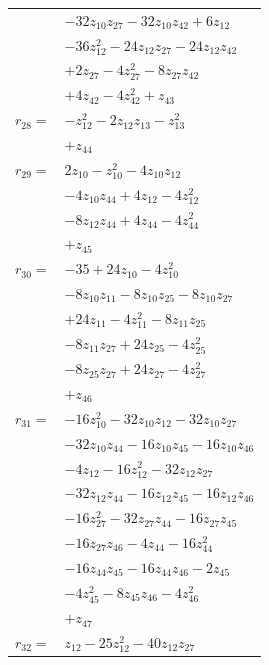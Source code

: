 \begin{longtable}{@{}r@{\;}l@{}}
 & \(\displaystyle -32z_{10}z_{27} -32z_{10}z_{42} +6z_{12}\) \\
 & \(\displaystyle -36z_{12}^{2} -24z_{12}z_{27} -24z_{12}z_{42}\) \\
 & \(\displaystyle +2z_{27} -4z_{27}^{2} -8z_{27}z_{42}\) \\
 & \(\displaystyle +4z_{42} -4z_{42}^{2} +z_{43}\) \\[3pt]
\(r_{28}=\) & \(\displaystyle -z_{12}^{2} -2z_{12}z_{13} -z_{13}^{2}\) \\
 & \(\displaystyle +z_{44}\) \\[3pt]
\(r_{29}=\) & \(\displaystyle 2z_{10} -z_{10}^{2} -4z_{10}z_{12}\) \\
 & \(\displaystyle -4z_{10}z_{44} +4z_{12} -4z_{12}^{2}\) \\
 & \(\displaystyle -8z_{12}z_{44} +4z_{44} -4z_{44}^{2}\) \\
 & \(\displaystyle +z_{45}\) \\[3pt]
\(r_{30}=\) & \(\displaystyle -35 +24z_{10} -4z_{10}^{2}\) \\
 & \(\displaystyle -8z_{10}z_{11} -8z_{10}z_{25} -8z_{10}z_{27}\) \\
 & \(\displaystyle +24z_{11} -4z_{11}^{2} -8z_{11}z_{25}\) \\
 & \(\displaystyle -8z_{11}z_{27} +24z_{25} -4z_{25}^{2}\) \\
 & \(\displaystyle -8z_{25}z_{27} +24z_{27} -4z_{27}^{2}\) \\
 & \(\displaystyle +z_{46}\) \\[3pt]
\(r_{31}=\) & \(\displaystyle -16z_{10}^{2} -32z_{10}z_{12} -32z_{10}z_{27}\) \\
 & \(\displaystyle -32z_{10}z_{44} -16z_{10}z_{45} -16z_{10}z_{46}\) \\
 & \(\displaystyle -4z_{12} -16z_{12}^{2} -32z_{12}z_{27}\) \\
 & \(\displaystyle -32z_{12}z_{44} -16z_{12}z_{45} -16z_{12}z_{46}\) \\
 & \(\displaystyle -16z_{27}^{2} -32z_{27}z_{44} -16z_{27}z_{45}\) \\
 & \(\displaystyle -16z_{27}z_{46} -4z_{44} -16z_{44}^{2}\) \\
 & \(\displaystyle -16z_{44}z_{45} -16z_{44}z_{46} -2z_{45}\) \\
 & \(\displaystyle -4z_{45}^{2} -8z_{45}z_{46} -4z_{46}^{2}\) \\
 & \(\displaystyle +z_{47}\) \\[3pt]
\(r_{32}=\) & \(\displaystyle z_{12} -25z_{12}^{2} -40z_{12}z_{27}\) \\

\end{longtable}
